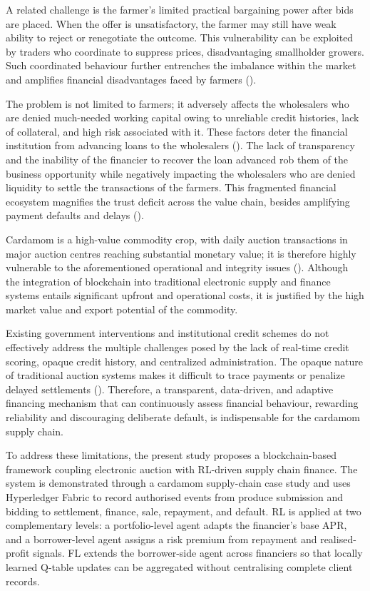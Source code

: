 \documentclass[12pt]{article}
\begin{document}
	A related challenge is the farmer's limited practical bargaining power after bids are placed. When the offer is unsatisfactory, the farmer may still have weak ability to reject or renegotiate the outcome. This vulnerability can be exploited by traders who coordinate to suppress prices, disadvantaging smallholder growers. Such coordinated behaviour further entrenches the imbalance within the market and amplifies financial disadvantages faced by farmers (\cite{acharya_agricultural_2004,reddy_status_2016}).
	
	The problem is not limited to farmers; it adversely affects the wholesalers who are denied much-needed working capital owing to unreliable credit histories, lack of collateral, and high risk associated with it. These factors deter the financial institution from advancing loans to the wholesalers (\cite{caniato_supply_2019}). The lack of transparency and the inability of the financier to recover the loan advanced rob them of the business opportunity while negatively impacting the wholesalers who are denied liquidity to settle the transactions of the farmers. This fragmented financial ecosystem magnifies the trust deficit across the value chain, besides amplifying payment defaults and delays (\cite{gelsomino_supply_2016}).
	
	
	Cardamom is a high-value commodity crop, with daily auction transactions in major auction centres reaching substantial monetary value; it is therefore highly vulnerable to the aforementioned operational and integrity issues (\cite{spicesboard_daily_price_2026,spicesboard2023annual,dgcis2023export,murugan_governance_2024}). Although the integration of blockchain into traditional electronic supply and finance systems entails significant upfront and operational costs, it is justified by the high market value and export potential of the commodity.
	
	Existing government interventions and institutional credit schemes do not effectively address the multiple challenges posed by the lack of real-time credit scoring, opaque credit history, and centralized administration.
	The opaque nature of traditional auction systems makes it difficult to trace payments or penalize delayed settlements (\cite{gelsomino_supply_2016}). Therefore, a transparent, data-driven, and adaptive financing mechanism that can continuously assess financial behaviour, rewarding reliability and discouraging deliberate default, is indispensable for the cardamom supply chain.
	
	To address these limitations, the present study proposes a blockchain-based framework coupling electronic auction with RL-driven supply chain finance. The system is demonstrated through a cardamom supply-chain case study and uses Hyperledger Fabric to record authorised events from produce submission and bidding to settlement, finance, sale, repayment, and default. RL is applied at two complementary levels: a portfolio-level agent adapts the financier's base APR, and a borrower-level agent assigns a risk premium from repayment and realised-profit signals. FL extends the borrower-side agent across financiers so that locally learned Q-table updates can be aggregated without centralising complete client records.
	
\end{document}
